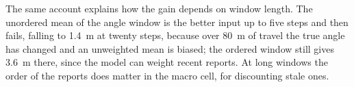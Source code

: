 The same account explains how the gain depends on window length. The unordered mean of the angle window is the better input up to five steps and then fails, falling to \SI{1.4}{\meter} at twenty steps, because over \SI{80}{\meter} of travel the true angle has changed and an unweighted mean is biased; the ordered window still gives \SI{3.6}{\meter} there, since the model can weight recent reports. At long windows the order of the reports does matter in the macro cell, for discounting stale ones.

